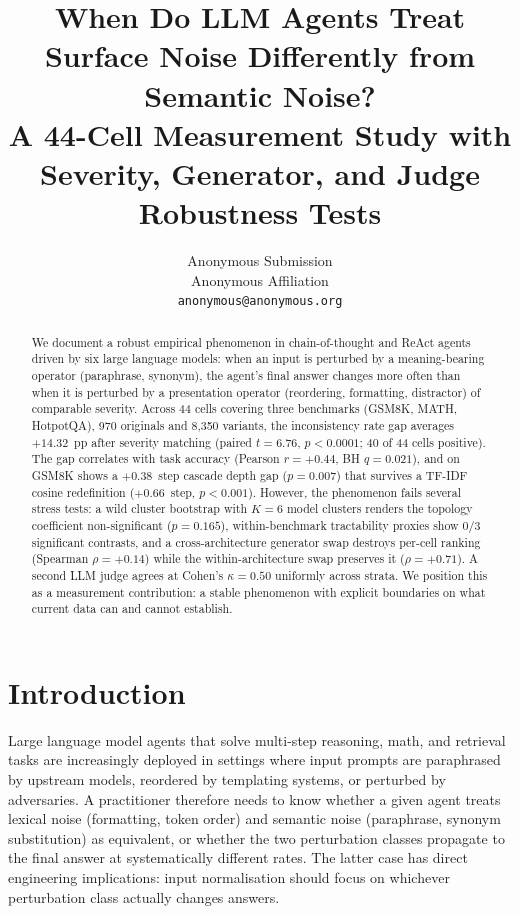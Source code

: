 \documentclass[11pt]{article}
\title{When Do {LLM} Agents Treat Surface Noise Differently from Semantic Noise?\\A 44-Cell Measurement Study with Severity, Generator, and Judge Robustness Tests}
\author{Anonymous Submission \\
  Anonymous Affiliation \\
  \texttt{anonymous@anonymous.org} \\}
\begin{document}
\maketitle

\begin{abstract}
We document a robust empirical phenomenon in chain-of-thought and ReAct agents driven by six large language models: when an input is perturbed by a meaning-bearing operator (paraphrase, synonym), the agent's final answer changes more often than when it is perturbed by a presentation operator (reordering, formatting, distractor) of comparable severity. Across 44 cells covering three benchmarks (GSM8K, MATH, HotpotQA), 970 originals and 8{,}350 variants, the inconsistency rate gap averages $+14.32$~pp after severity matching (paired $t=6.76$, $p<0.0001$; 40 of 44 cells positive). The gap correlates with task accuracy (Pearson $r=+0.44$, BH $q=0.021$), and on GSM8K shows a $+0.38$~step cascade depth gap ($p=0.007$) that survives a TF-IDF cosine redefinition ($+0.66$~step, $p<0.001$). However, the phenomenon fails several stress tests: a wild cluster bootstrap with $K=6$ model clusters renders the topology coefficient non-significant ($p=0.165$), within-benchmark tractability proxies show $0/3$ significant contrasts, and a cross-architecture generator swap destroys per-cell ranking (Spearman $\rho=+0.14$) while the within-architecture swap preserves it ($\rho=+0.71$). A second LLM judge agrees at Cohen's $\kappa=0.50$ uniformly across strata. We position this as a measurement contribution: a stable phenomenon with explicit boundaries on what current data can and cannot establish.
\end{abstract}

\section{Introduction}

Large language model agents that solve multi-step reasoning, math, and retrieval tasks are increasingly deployed in settings where input prompts are paraphrased by upstream models, reordered by templating systems, or perturbed by adversaries. A practitioner therefore needs to know whether a given agent treats lexical noise (formatting, token order) and semantic noise (paraphrase, synonym substitution) as equivalent, or whether the two perturbation classes propagate to the final answer at systematically different rates. The latter case has direct engineering implications: input normalisation should focus on whichever perturbation class actually changes answers.
\end{document}
